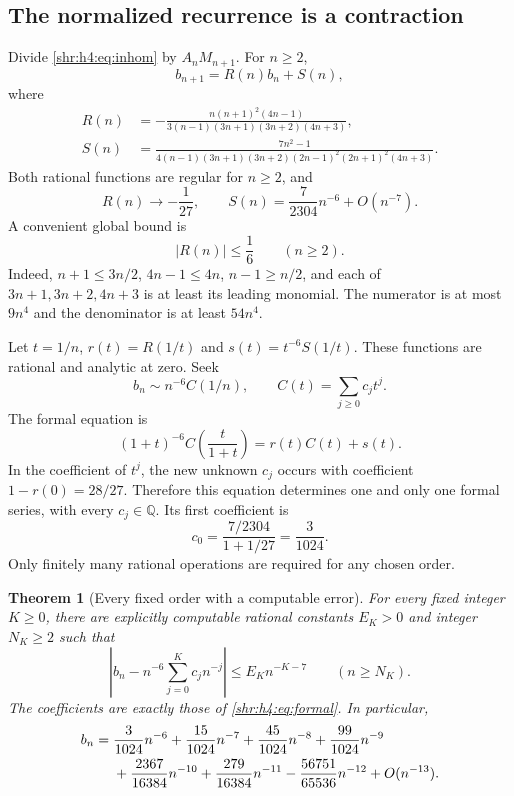 \documentclass[11pt,letterpaper]{article}
\numberwithin{equation}{section}
\newtheorem{theorem}{Theorem}[section]
\theoremstyle{definition}
\newcommand{\Q}{\mathbb Q}
\newcommand{\1}{\mathbf 1}
\begin{document}
\subsection{The normalized recurrence is a contraction}
Divide \eqref{shr:h4:eq:inhom} by $A_nM_{n+1}$. For $n\ge2$,
\begin{equation}
 b_{n+1}=R(n)b_n+S(n),
 \label{shr:h4:eq:brec}
\end{equation}
where
\begin{align}
 R(n)&=-\frac{n(n+1)^2(4n-1)}
 {3(n-1)(3n+1)(3n+2)(4n+3)},\label{shr:h4:eq:R}\\
 S(n)&=\frac{7n^2-1}
 {4(n-1)(3n+1)(3n+2)(2n-1)^2(2n+1)^2(4n+3)}.
 \label{shr:h4:eq:S}
\end{align}
Both rational functions are regular for $n\ge2$, and
\begin{equation}
 R(n)\longrightarrow-\frac1{27},\qquad
 S(n)=\frac7{2304}n^{-6}+O(n^{-7}).
 \label{shr:h4:eq:RSlead}
\end{equation}
A convenient global bound is
\begin{equation}
 |R(n)|\le\frac16\qquad(n\ge2).
 \label{shr:h4:eq:contraction}
\end{equation}
Indeed, $n+1\le3n/2$, $4n-1\le4n$, $n-1\ge n/2$, and each of
$3n+1,3n+2,4n+3$ is at least its leading monomial. The numerator is at
most $9n^4$ and the denominator is at least $54n^4$.

Let $t=1/n$, $r(t)=R(1/t)$ and $s(t)=t^{-6}S(1/t)$. These functions are
rational and analytic at zero. Seek
\[
 b_n\sim n^{-6}C(1/n),\qquad C(t)=\sum_{j\ge0}c_jt^j.
\]
The formal equation is
\begin{equation}
 (1+t)^{-6}C\left(\frac{t}{1+t}\right)=r(t)C(t)+s(t).
 \label{shr:h4:eq:formal}
\end{equation}
In the coefficient of $t^j$, the new unknown $c_j$ occurs with coefficient
$1-r(0)=28/27$. Therefore this equation determines one and only one
formal series, with every $c_j\in\Q$. Its first coefficient is
\[
 c_0=\frac{7/2304}{1+1/27}=\frac3{1024}.
\]
Only finitely many rational operations are required for any chosen order.

\begin{theorem}[Every fixed order with a computable error]
\label{shr:h4:thm:bexp}
For every fixed integer $K\ge0$, there are explicitly computable rational
constants $E_K>0$ and integer $N_K\ge2$ such that
\begin{equation}
 \left|b_n-n^{-6}\sum_{j=0}^Kc_jn^{-j}\right|
 \le E_Kn^{-K-7}\qquad(n\ge N_K).
 \label{shr:h4:eq:b-error}
\end{equation}
The coefficients are exactly those of \eqref{shr:h4:eq:formal}. In particular,
\begin{align}
 b_n={}&\frac3{1024}n^{-6}+\frac{15}{1024}n^{-7}
 +\frac{45}{1024}n^{-8}+\frac{99}{1024}n^{-9}\notag\\
 &+\frac{2367}{16384}n^{-10}+\frac{279}{16384}n^{-11}
 -\frac{56751}{65536}n^{-12}+O(n^{-13}).
 \label{shr:h4:eq:bcoefficients}
\end{align}
\end{theorem}
\end{document}

